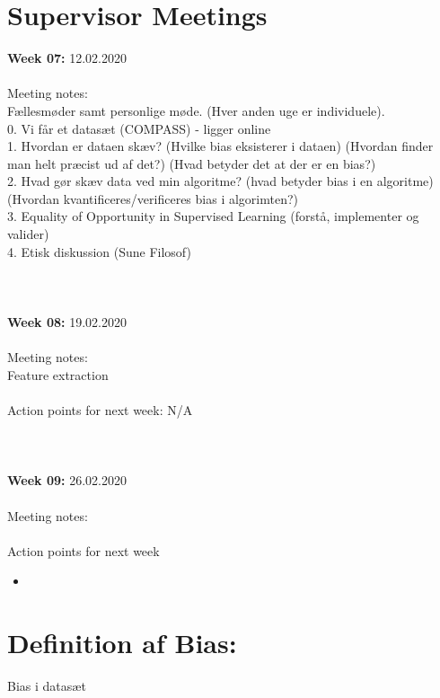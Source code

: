 \documentclass[11pt, fleqn]{article}
\begin{document}
\section*{Supervisor Meetings}
	
	\textbf{Week 07:}  12.02.2020 \\\\
	\noindent
	Meeting notes: \\ Fællesmøder samt personlige møde. (Hver anden uge er individuele). \\0. Vi får et datasæt (COMPASS) - ligger online \\
	1. Hvordan er dataen skæv? (Hvilke bias eksisterer i dataen) (Hvordan finder man helt præcist ud af det?) (Hvad betyder det at der er en bias?) \\
	2. Hvad gør skæv data ved min algoritme? (hvad betyder bias i en algoritme) (Hvordan kvantificeres/verificeres bias i algorimten?) \\
	3. Equality of Opportunity in Supervised Learning (forstå, implementer og valider) \\ 
	4. Etisk diskussion (Sune Filosof)
	\\\\\\\\
	\textbf{Week 08:}  19.02.2020 \\\\
	\noindent
	Meeting notes: \\ Feature extraction
	\\\\
	Action points for next week: N/A
	\\\\\\\\
	\textbf{Week 09:}  26.02.2020 \\\\
	\noindent
	Meeting notes: 
	\\\\
	Action points for next week
	\begin{itemize}
		\item  
	\end{itemize}

\section*{Definition af Bias:}
	
	Bias i datasæt 
		
	
\end{document}
